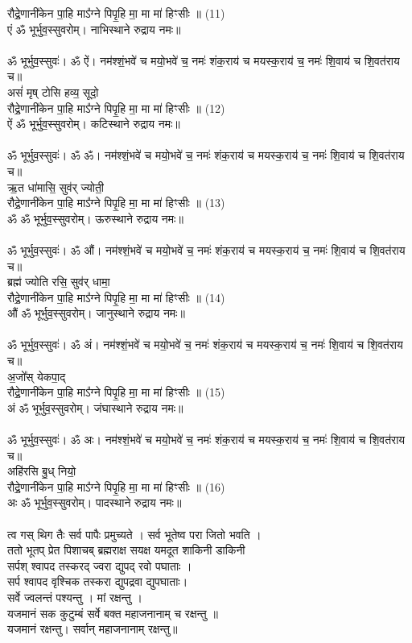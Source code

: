 रौद्रे॒णानी॑केन पा॒हि माऽ᳚ग्ने पिपृ॒हि मा॒ मा मा॑ हिꣳसीः ॥ (11)\\
{\small एं ॐ भूर्भुव॒स्सुवरोम्। नाभिस्थाने रुद्राय नमः॥}\\
\\
{\small ॐ भूर्भुव॒स्सुवः॑। ॐ ऐं। नम॑श्शं॒भवे॑ च मयो॒भवे॑ च॒ नमः॑ शंक॒राय॑ च मयस्क॒राय॑ च॒ नमः॑ शि॒वाय॑ च शि॒वत॑राय च॥}\\
असं॑ मृष् टोसि हव्य॒ सूदो॒\\
रौद्रे॒णानी॑केन पा॒हि माऽ᳚ग्ने पिपृ॒हि मा॒ मा मा॑ हिꣳसीः ॥ (12)\\
{\small ऐं ॐ भूर्भुव॒स्सुवरोम्। कटिस्थाने रुद्राय नमः॥}\\
\\
{\small ॐ भूर्भुव॒स्सुवः॑। ॐ ॐ। नम॑श्शं॒भवे॑ च मयो॒भवे॑ च॒ नमः॑ शंक॒राय॑ च मयस्क॒राय॑ च॒ नमः॑ शि॒वाय॑ च शि॒वत॑राय च॥}\\
ऋ॒त धा॑मासि॒ सुव॑र् ज्योती॒\\
रौद्रे॒णानी॑केन पा॒हि माऽ᳚ग्ने पिपृ॒हि मा॒ मा मा॑ हिꣳसीः ॥ (13)\\
{\small ॐ ॐ भूर्भुव॒स्सुवरोम्। ऊरुस्थाने रुद्राय नमः॥}\\
\\
{\small ॐ भूर्भुव॒स्सुवः॑। ॐ औं। नम॑श्शं॒भवे॑ च मयो॒भवे॑ च॒ नमः॑ शंक॒राय॑ च मयस्क॒राय॑ च॒ नमः॑ शि॒वाय॑ च शि॒वत॑राय च॥}\\
ब्रह्म॑ ज्योति रसि॒ सुव॑र् धामा॒\\
रौद्रे॒णानी॑केन पा॒हि माऽ᳚ग्ने पिपृ॒हि मा॒ मा मा॑ हिꣳसीः ॥ (14)\\
{\small औं ॐ भूर्भुव॒स्सुवरोम्। जानुस्थाने रुद्राय नमः॥}\\
\\
{\small ॐ भूर्भुव॒स्सुवः॑। ॐ अं। नम॑श्शं॒भवे॑ च मयो॒भवे॑ च॒ नमः॑ शंक॒राय॑ च मयस्क॒राय॑ च॒ नमः॑ शि॒वाय॑ च शि॒वत॑राय च॥}\\
अ॒जो᳚स् येकपा॒द्\\
रौद्रे॒णानी॑केन पा॒हि माऽ᳚ग्ने पिपृ॒हि मा॒ मा मा॑ हिꣳसीः ॥ (15)\\
{\small अं ॐ भूर्भुव॒स्सुवरोम्। जंघास्थाने रुद्राय नमः॥}\\
\\
{\small ॐ भूर्भुव॒स्सुवः॑। ॐ अः। नम॑श्शं॒भवे॑ च मयो॒भवे॑ च॒ नमः॑ शंक॒राय॑ च मयस्क॒राय॑ च॒ नमः॑ शि॒वाय॑ च शि॒वत॑राय च॥}\\
अहि॑रसि बु॒ध् नियो॒\\
रौद्रे॒णानी॑केन पा॒हि माऽ᳚ग्ने पिपृ॒हि मा॒ मा मा॑ हिꣳसीः ॥ (16)\\
{\small अः ॐ भूर्भुव॒स्सुवरोम्। पादस्थाने रुद्राय नमः॥}\\
\\
त्व गस् थिग तैः सर्व पापैः प्रमुच्यते । सर्व भूतेष्व परा जितो भवति ।\\
ततो भूतप् प्रेत पिशाचब् ब्रह्मराक्ष सयक्ष यमदूत शाकिनी डाकिनी \\
सर्पश् श्वापद तस्करद् ज्वरा द्युपद् रवो पघाताः । \\
{\small सर्प श्वापद वृश्चिक तस्करा द्युपद्रवा द्युपघाताः।}\\
सर्वे ज्वलन्तं पश्यन्तु । मां रक्षन्तु ।\\
यजमानं सक कुटुम्बं सर्वे बक्त महाजनानाम्  च  रक्षन्तु ॥\\
{\small यजमानं रक्षन्तु। सर्वान् महाजनानाम् रक्षन्तु॥}\\
